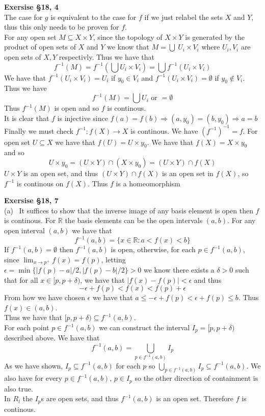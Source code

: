 \documentclass[12pt]{article}
\newenvironment{ques}[1]{\textbf{Exersise #1}\vspace{1 mm}\\ }{\bigskip}
\theoremstyle{definition}
\renewcommand{\l}{\left }
\renewcommand{\r}{\right }
\newcommand{\R}{\mathbb R}
\begin{document}
\begin{ques}{\S 18, 4}
	The case for $g$ is equivalent to the case for $f$ if we just relabel
	the sets $X$ and $Y$, thus this only needs to be proven for $f$.\\
	For any open set $M \subseteq X \times Y$, since the topology of
	$X \times Y$ is generated by the product of open sets of $X$ and $Y$ we
	know that $M = \bigcup \ U_i \times V_i$ where $U_i,V_i$ are open sets of $X, Y$
	respectivly. Thus we have that
	$$f^{-1}(M) = f^{-1}\l(\bigcup U_i \times V_i\r) = \bigcup f^{-1}(U_i \times V_i)$$
	We have that $f^{-1}(U_i \times V_i) = U_i$ if $y_0 \in V_i$ and
	$f^{-1}(U_i \times V_i) = \emptyset$ if $y_0 \notin V_i$. Thus we have
	$$f^{-1}(M) = \bigcup U_i \text{ or } = \emptyset$$
	Thus $f^{-1}(M)$ is open and so $f$ is continous. \\
	It is clear that $f$ is injective since $f(a) = f(b) \Rightarrow
	(a,y_0) = (b, y_0) \Rightarrow a= b$\\
	Finally we must check $f^{-1} : f(X) \to X$ is continous. We have
	$(f^{-1})^{-1} = f$. For open set $U \subseteq X$ we have that $f(U) = U
	\times y_0$. We have that $f(X) = X \times y_0$ and so 
	$$U \times y_0 = (U \times Y) \cap (X \times y_0) = (U \times Y) \cap f(X)$$
	$U \times Y$ is an open set, and thus $(U \times Y) \cap f(X)$ is an open
	set in $f(X)$, so $f^{-1}$ is continous on $f(X)$. Thus $f$ is a homeomorphism
\end{ques}

\begin{ques}{\S 18, 7}
	(a) \ It suffices to show that the inverse image of any basis element is
	open then $f$ is continous. For $\R$ the basis elements can be the open
	intervals $(a,b)$. For any open interval $(a,b)$ we have that
	$$f^{-1}(a,b) = \{x \in \R: a < f(x) < b\}$$
	If $f^{-1}(a,b) = \emptyset$ then $f^{-1}(a,b)$ is open, otherwise, for
	each $p \in f^{-1}(a,b)$, since $\lim_{x \to p^+} f(x) = f(p)$, letting
	$\epsilon = \min\{|f(p)-a|/2, |f(p) - b|/2\} > 0$ we  know there
	exists a $\delta > 0$ such that for all $x \in [p, p + \delta)$, we have
	that $|f(x) - f(p)| < \epsilon$ and thus 
	$$-\epsilon + f(p) < f(x) < f(p) + \epsilon$$
	From how we have chosen $\epsilon$ we have that $a \leq -\epsilon + f(p) <
	\epsilon + f(p) \leq b$. Thus $f(x) \in (a,b)$.\\
	Thus we have that $[p, p+ \delta) \subseteq f^{-1}(a,b)$.\\
	For each point $p \in f^{-1}(a,b)$ we can construct the interval $I_p = [p, p +
	\delta)$ described above. We have that 
	$$f^{-1}(a,b) = \bigcup_{p \in f^{-1}(a,b)} I_p$$
	As we have shown, $I_p \subseteq f^{-1}(a,b)$ for each $p$ so 
	$\bigcup_{p \in f^{-1}(a,b)} I_p \subseteq f^{-1}(a,b)$. We also have for
	every $p \in f^{-1}(a,b)$, $p \in I_p$ so the other direction of
	containment is also true.\\
	In $R_l$ the $I_p$s are open sets, and thus $f^{-1}(a,b)$ is an open set.
	Therefore $f$ is continous.
	
\end{ques}
\end{document}

